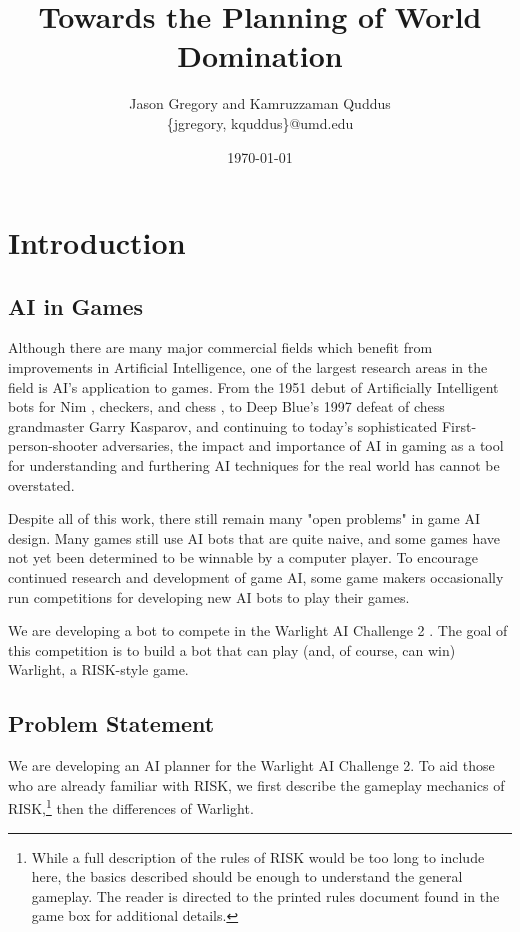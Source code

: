 \documentclass[a4paper,11pt]{article}
\begin{document}
\title{Towards the Planning of World Domination}
\author{Jason Gregory and Kamruzzaman Quddus \\ \{jgregory, kquddus\}@umd.edu}
\date{\today}

\maketitle

%

\section{Introduction}\label{sec:intro}
\subsection{AI in Games}\label{aiingames}
Although there are many major commercial fields which benefit from improvements
in Artificial Intelligence, one of the largest research areas in the field is
AI's application to games.  From the 1951 debut of Artificially Intelligent bots
for Nim \cite{nim}, checkers, and chess \cite{checkerschess}, to Deep Blue's 1997
defeat of chess grandmaster Garry Kasparov, and continuing to today's sophisticated
First-person-shooter adversaries, the impact and importance of AI in gaming as a
tool for understanding and furthering AI techniques for the real world has cannot
be overstated.

Despite all of this work, there still remain many "open problems" in game AI
design.  Many games still use AI bots that are quite naive, and some games have
not yet been determined to be winnable by a computer player. To encourage continued
research and development of game AI, some game makers occasionally run competitions
for developing new AI bots to play their games.

We are developing a bot to compete in the Warlight AI Challenge 2 \cite{warlight}.
The goal of this competition is to build a bot that can play (and, of course, can
win) Warlight, a RISK-style game.

\subsection{Problem Statement}\label{sec:problem}
We are developing an AI planner for the Warlight AI Challenge 2.  To aid those who
are already familiar with RISK, we first describe the gameplay mechanics of 
RISK,\footnote{While a full description of the rules of RISK would be too long to 
include here, the basics described should be enough to understand the general 
gameplay.  The reader is directed to the printed rules document found in the game 
box for additional details.} then the differences of Warlight.
\end{document}
